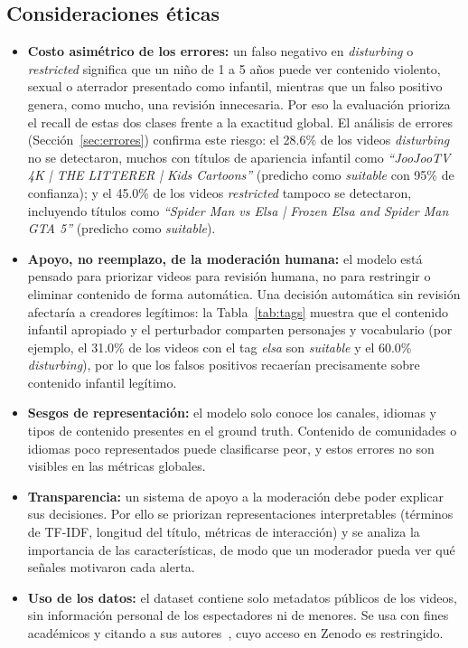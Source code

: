 \documentclass[conference]{IEEEtran}
\begin{document}
\subsection{Consideraciones éticas}\label{sec:etica}
\begin{itemize}
\item \textbf{Costo asimétrico de los errores:} un falso negativo en \textit{disturbing} o \textit{restricted} significa que un niño de 1 a 5 años puede ver contenido violento, sexual o aterrador presentado como infantil, mientras que un falso positivo genera, como mucho, una revisión innecesaria. Por eso la evaluación prioriza el recall de estas dos clases frente a la exactitud global. El análisis de errores (Sección~\ref{sec:errores}) confirma este riesgo: el 28.6\% de los videos \textit{disturbing} no se detectaron, muchos con títulos de apariencia infantil como \emph{``JooJooTV 4K | THE LITTERER | Kids Cartoons''} (predicho como \textit{suitable} con 95\% de confianza); y el 45.0\% de los videos \textit{restricted} tampoco se detectaron, incluyendo títulos como \emph{``Spider Man vs Elsa | Frozen Elsa and Spider Man GTA 5''} (predicho como \textit{suitable}).
\item \textbf{Apoyo, no reemplazo, de la moderación humana:} el modelo está pensado para priorizar videos para revisión humana, no para restringir o eliminar contenido de forma automática. Una decisión automática sin revisión afectaría a creadores legítimos: la Tabla~\ref{tab:tags} muestra que el contenido infantil apropiado y el perturbador comparten personajes y vocabulario (por ejemplo, el 31.0\% de los videos con el tag \textit{elsa} son \textit{suitable} y el 60.0\% \textit{disturbing}), por lo que los falsos positivos recaerían precisamente sobre contenido infantil legítimo.
\item \textbf{Sesgos de representación:} el modelo solo conoce los canales, idiomas y tipos de contenido presentes en el ground truth. Contenido de comunidades o idiomas poco representados puede clasificarse peor, y estos errores no son visibles en las métricas globales.
\item \textbf{Transparencia:} un sistema de apoyo a la moderación debe poder explicar sus decisiones. Por ello se priorizan representaciones interpretables (términos de TF-IDF, longitud del título, métricas de interacción) y se analiza la importancia de las características, de modo que un moderador pueda ver qué señales motivaron cada alerta.
\item \textbf{Uso de los datos:} el dataset contiene solo metadatos públicos de los videos, sin información personal de los espectadores ni de menores. Se usa con fines académicos y citando a sus autores~\cite{papadamou,papadamou_data}, cuyo acceso en Zenodo es restringido.
\end{itemize}
\end{document}

